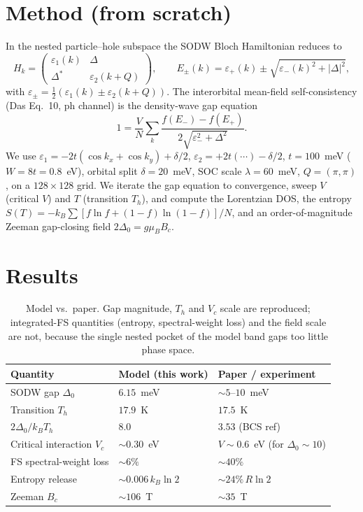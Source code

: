 \documentclass[11pt]{article}
\begin{document}
\section{Method (from scratch)}
In the nested particle--hole subspace the SODW Bloch Hamiltonian reduces to
\begin{equation}
H_k=\begin{pmatrix}\varepsilon_1(k) & \Delta\\ \Delta^* & \varepsilon_2(k+Q)\end{pmatrix},
\qquad
E_\pm(k)=\varepsilon_+(k)\pm\sqrt{\varepsilon_-(k)^2+|\Delta|^2},
\end{equation}
with $\varepsilon_\pm=\tfrac12(\varepsilon_1(k)\pm\varepsilon_2(k+Q))$. The
interorbital mean-field self-consistency (Das Eq.~10, ph channel) is the
density-wave gap equation
\begin{equation}
1=\frac{V}{N}\sum_k\frac{f(E_-)-f(E_+)}{2\sqrt{\varepsilon_-^2+\Delta^2}} .
\end{equation}
We use $\varepsilon_1=-2t(\cos k_x+\cos k_y)+\delta/2$, $\varepsilon_2=+2t(\cdots)-\delta/2$,
$t=100$~meV ($W=8t=0.8$~eV), orbital split $\delta=20$~meV, SOC scale $\lambda=60$~meV,
$Q=(\pi,\pi)$, on a $128\times128$ grid. We iterate the gap equation to convergence,
sweep $V$ (critical $V$) and $T$ (transition $T_h$), and compute the Lorentzian DOS,
the entropy $S(T)=-k_B\sum[f\ln f+(1-f)\ln(1-f)]/N$, and an order-of-magnitude
Zeeman gap-closing field $2\Delta_0=g\mu_B B_c$.

\section{Results}
\begin{table}[h]\centering
\begin{tabular}{lll}
\toprule
Quantity & Model (this work) & Paper / experiment\\
\midrule
SODW gap $\Delta_0$        & $6.15$~meV       & $\sim5$--$10$~meV \\
Transition $T_h$           & $17.9$~K         & $17.5$~K \\
$2\Delta_0/k_BT_h$         & $8.0$            & $3.53$ (BCS ref) \\
Critical interaction $V_c$ & $\sim0.30$~eV    & $V\sim0.6$~eV (for $\Delta_0\sim10$) \\
FS spectral-weight loss    & $\sim6\%$        & $\sim40\%$ \\
Entropy release            & $\sim0.006\,k_B\ln2$ & $\sim24\%\,R\ln2$ \\
Zeeman $B_c$               & $\sim106$~T      & $\sim35$~T \\
\bottomrule
\end{tabular}
\caption{Model vs.\ paper. Gap magnitude, $T_h$ and $V_c$ scale are reproduced;
integrated-FS quantities (entropy, spectral-weight loss) and the field scale are
not, because the single nested pocket of the model band gaps too little phase space.}
\end{table}
\end{document}
